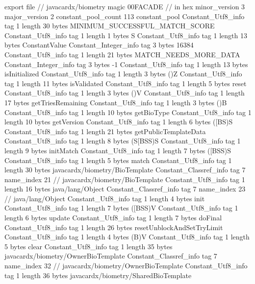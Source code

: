 export file {		// javacardx/biometry
	magic	00FACADE		 // in hex
	minor_version	3
	major_version	2
	constant_pool_count	113
	constant_pool {
		Constant_Utf8_info {
			tag	1
			length	30
			bytes	MINIMUM_SUCCESSFUL_MATCH_SCORE
		}
		Constant_Utf8_info {
			tag	1
			length	1
			bytes	S
		}
		Constant_Utf8_info {
			tag	1
			length	13
			bytes	ConstantValue
		}
		Constant_Integer_info {
			tag	3
			bytes	16384
		}
		Constant_Utf8_info {
			tag	1
			length	21
			bytes	MATCH_NEEDS_MORE_DATA
		}
		Constant_Integer_info {
			tag	3
			bytes	-1
		}
		Constant_Utf8_info {
			tag	1
			length	13
			bytes	isInitialized
		}
		Constant_Utf8_info {
			tag	1
			length	3
			bytes	()Z
		}
		Constant_Utf8_info {
			tag	1
			length	11
			bytes	isValidated
		}
		Constant_Utf8_info {
			tag	1
			length	5
			bytes	reset
		}
		Constant_Utf8_info {
			tag	1
			length	3
			bytes	()V
		}
		Constant_Utf8_info {
			tag	1
			length	17
			bytes	getTriesRemaining
		}
		Constant_Utf8_info {
			tag	1
			length	3
			bytes	()B
		}
		Constant_Utf8_info {
			tag	1
			length	10
			bytes	getBioType
		}
		Constant_Utf8_info {
			tag	1
			length	10
			bytes	getVersion
		}
		Constant_Utf8_info {
			tag	1
			length	6
			bytes	([BS)S
		}
		Constant_Utf8_info {
			tag	1
			length	21
			bytes	getPublicTemplateData
		}
		Constant_Utf8_info {
			tag	1
			length	8
			bytes	(S[BSS)S
		}
		Constant_Utf8_info {
			tag	1
			length	9
			bytes	initMatch
		}
		Constant_Utf8_info {
			tag	1
			length	7
			bytes	([BSS)S
		}
		Constant_Utf8_info {
			tag	1
			length	5
			bytes	match
		}
		Constant_Utf8_info {
			tag	1
			length	30
			bytes	javacardx/biometry/BioTemplate
		}
		Constant_Classref_info {
			tag	7
			name_index	21		// javacardx/biometry/BioTemplate
		}
		Constant_Utf8_info {
			tag	1
			length	16
			bytes	java/lang/Object
		}
		Constant_Classref_info {
			tag	7
			name_index	23		// java/lang/Object
		}
		Constant_Utf8_info {
			tag	1
			length	4
			bytes	init
		}
		Constant_Utf8_info {
			tag	1
			length	7
			bytes	([BSS)V
		}
		Constant_Utf8_info {
			tag	1
			length	6
			bytes	update
		}
		Constant_Utf8_info {
			tag	1
			length	7
			bytes	doFinal
		}
		Constant_Utf8_info {
			tag	1
			length	26
			bytes	resetUnblockAndSetTryLimit
		}
		Constant_Utf8_info {
			tag	1
			length	4
			bytes	(B)V
		}
		Constant_Utf8_info {
			tag	1
			length	5
			bytes	clear
		}
		Constant_Utf8_info {
			tag	1
			length	35
			bytes	javacardx/biometry/OwnerBioTemplate
		}
		Constant_Classref_info {
			tag	7
			name_index	32		// javacardx/biometry/OwnerBioTemplate
		}
		Constant_Utf8_info {
			tag	1
			length	36
			bytes	javacardx/biometry/SharedBioTemplate
}}}
